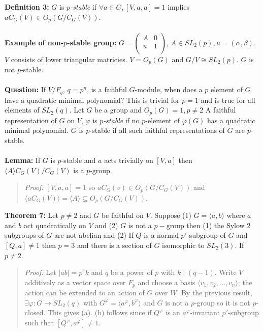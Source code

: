 {\bf Definition 3:} $G$ is \emph {$p$-stable} if $\forall a \in G, [V,a,a]=1$ implies 
$a C_G(V) \in O_p ( G/C_G(V))$.
\\
\\
{\bf Example of non-$p$-stable group:} $G= 
\left(
\begin{array}{cc}
A & 0 \\
u & 1 \\
\end{array}
\right)
$, $A \in SL_2(p), u= (\alpha, \beta)$. $V$ consists of lower triangular matricies. $V = O_p(G)$ and
$G/V \cong SL_2(p)$.  $G$ is not $p$-stable.
\\
\\
{\bf Question:}  If $V/F_q$, $q= p^n$, is a faithful $G$-module, when does a $p$ element of
$G$ have a quadratic minimal polynomial?  This is trivial for $p=1$ and is true for
all elements of $SL_2(q)$.  Let $G$ be a group and $O_p(G)=1, p \ne 2$
A faithful representation of $G$ on $V$, $\varphi$ is \emph{$p$-stable} if
no $p$-element of $\varphi(G)$ has a quadratic minimal polynomial.  $G$ is $p$-stable
if all such faithful representations of $G$ are $p$-stable.
\\
\\
{\bf Lemma:} If $G$ is $p$-stable and $a$ acts trivially on $[V,a]$ then $ \langle A \rangle 
C_G(V)/C_G(V)$ 
is a $p$-group.
\begin{quote}
\emph{Proof:}  
$[V,a,a]=1$ so $a C_G(v) 
\in O_p(G/C_G(V))$ and $\langle a C_G(V) \rangle = \langle A \rangle
\subseteq  O_p(G/C_G(V))$.
\end{quote}
{\bf Theorem 7:} Let $p \ne 2$ and $G$ be faithful on $V$.
Suppose (1) $G= \langle a,b \rangle $ where $a$ and $b$ act quadratically on $V$ and
(2) $G$ is not a $p-$group then (1) the Sylow $2$ subgroups of $G$ are not abelian and
(2) If $Q$ is a normal $p'$-subgroup of $G$ and $[Q,a] \ne 1$ then $p=3$ and there
is a section of $G$ isomorphic to $SL_2(3)$.  If $p \ne 2$.
\begin{quote}
\emph{Proof:}  
Let $|ab|= p^e k$ and $q$ be a power of $p$ with $k \mid (q-1)$.  Write $V$ additively
as a vector space over $F_p$ and choose a basis $ \langle v_1 , v_2 , \ldots , v_n \rangle $; 
the action
can be extended to an action of $G$ over $W$.  By the previous result,
$\exists \varphi: G \rightarrow SL_2(q)$ with 
$G^{\varphi}= \langle a^{\varphi}, b^{\varphi} \rangle $ and
$G$ is not a $p$-group so it is not $p$-closed.  This gives (a).  (b) follows since
if $Q^{\varphi}$ is an $a^{\varphi}$-invariant $p'$-subgroup
such that $[Q^{\varphi}, a^{\varphi}] \ne 1$.
\end{quote}
